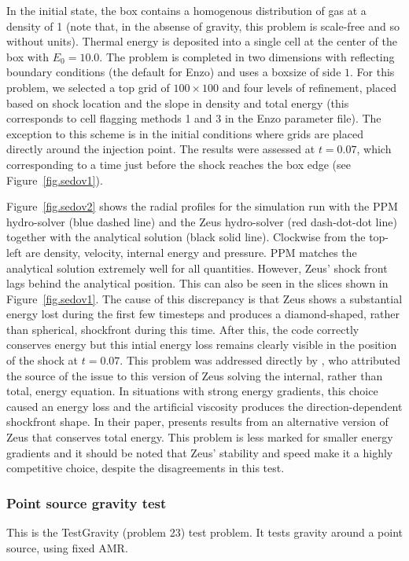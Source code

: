 In the initial state, the box contains a homogenous distribution of gas at a density of 1 (note that, in the absense of gravity, this problem is scale-free and so without units). Thermal energy is deposited into a single cell at the center of the box with $E_0 = 10.0$. The problem is completed in two dimensions with reflecting boundary conditions (the default for Enzo) and uses a boxsize of side $1$. For this problem, we selected a top grid of $100 \times 100$ and four levels of refinement, placed based on shock location and the slope in density and total energy (this corresponds to cell flagging methods 1 and 3 in the Enzo parameter file). The exception to this scheme is in the initial conditions where grids are placed directly around the injection point. The results were assessed at $t = 0.07$, which corresponding to a time just before the shock reaches the box edge (see Figure~\ref{fig.sedov1}).

Figure~\ref{fig.sedov2} shows the radial profiles for the simulation run with the PPM hydro-solver (blue dashed line) and the Zeus hydro-solver (red dash-dot-dot line) together with the analytical solution (black solid line). Clockwise from the top-left are density, velocity, internal energy and pressure. PPM matches the analytical solution extremely well for all quantities. However, Zeus' shock front lags behind the analytical position. This can also be seen in the slices shown in Figure~\ref{fig.sedov1}. The cause of this discrepancy is that Zeus shows a substantial energy lost during the first few timesteps and produces a diamond-shaped, rather than spherical, shockfront during this time. After this, the code correctly conserves energy but this intial energy loss remains clearly visible in the position of the shock at $t = 0.07$. This problem was addressed directly by \citet{Clarke2010}, who attributed the source of the issue to this version of Zeus solving the internal, rather than total, energy equation. In situations with strong energy gradients, this choice caused an energy loss and the artificial viscosity produces the direction-dependent shockfront shape. In their paper, \citet{Clarke2010} presents results from an alternative version of Zeus that conserves total energy. This problem is less marked for smaller energy gradients and it should be noted that Zeus' stability and speed make it a highly competitive choice, despite the disagreements in this test. 


\subsubsection{Point source gravity test}
\label{sec.test.gravitypointsource}
This is the TestGravity (problem 23) test problem.  It tests gravity around a point source, using fixed AMR.

